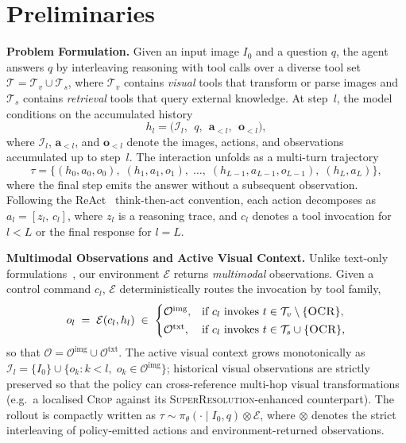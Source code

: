 \section{Preliminaries}
\label{sec:method}

\textbf{Problem Formulation.}
Given an input image $I_0$ and a question $q$, the agent answers $q$ by interleaving reasoning with tool calls over a diverse tool set $\mathcal{T} = \mathcal{T}_v \cup \mathcal{T}_s$, where $\mathcal{T}_v$ contains \emph{visual} tools that transform or parse images and $\mathcal{T}_s$ contains \emph{retrieval} tools that query external knowledge.
At step~$l$, the model conditions on the accumulated history
\begin{equation}
  h_l = \bigl(\mathcal{I}_l,\;\, q,\;\, \mathbf{a}_{<l},\;\, \mathbf{o}_{<l}\bigr),
  \label{eq:history}
\end{equation}
where $\mathcal{I}_l$, $\mathbf{a}_{<l}$, and $\mathbf{o}_{<l}$ denote the images, actions, and observations accumulated up to step~$l$.
The interaction unfolds as a multi-turn trajectory
\begin{equation}
    \tau = \bigl\{(h_0, a_0, o_0),\; (h_1, a_1, o_1),\; \dots,\; (h_{L-1}, a_{L-1}, o_{L-1}),\; (h_L, a_L)\bigr\},
    \label{eq:trajectory}
\end{equation}
where the final step emits the answer without a subsequent observation. Following the ReAct~\citep{yao2022react} think-then-act convention, each action decomposes as $a_l = [z_l,\, c_l]$, where $z_l$ is a reasoning trace, and $c_l$ denotes a tool invocation for $l<L$ or the final response for $l=L$.

\textbf{Multimodal Observations and Active Visual Context.}
Unlike text-only formulations~\citep{jin2025searchr1trainingllmsreason}, our environment $\mathcal{E}$ returns \emph{multimodal} observations. Given a control command $c_l$, $\mathcal{E}$ deterministically routes the invocation by tool family,
\begin{equation}
    o_l \;=\; \mathcal{E}(c_l, h_l) \;\in\;
    \begin{cases}
        \mathcal{O}^{\text{img}}, & \text{if } c_l \text{ invokes } t \in \mathcal{T}_v \setminus \{\textsc{OCR}\}, \\[2pt]
        \mathcal{O}^{\text{txt}}, & \text{if } c_l \text{ invokes } t \in \mathcal{T}_s \cup \{\textsc{OCR}\},
    \end{cases}
    \label{eq:obs-routing}
\end{equation}
so that $\mathcal{O} = \mathcal{O}^{\text{img}} \cup \mathcal{O}^{\text{txt}}$. The active visual context grows monotonically as $\mathcal{I}_l = \{I_0\} \cup \{o_k : k < l,\; o_k \in \mathcal{O}^{\text{img}}\}$; historical visual observations are strictly preserved so that the policy can cross-reference multi-hop visual transformations (e.g.\ a localised \textsc{Crop} against its \textsc{SuperResolution}-enhanced counterpart). The rollout is compactly written as $\tau \sim \pi_\theta(\cdot \mid I_0, q) \otimes \mathcal{E}$, where $\otimes$ denotes the strict interleaving of policy-emitted actions and environment-returned observations.


